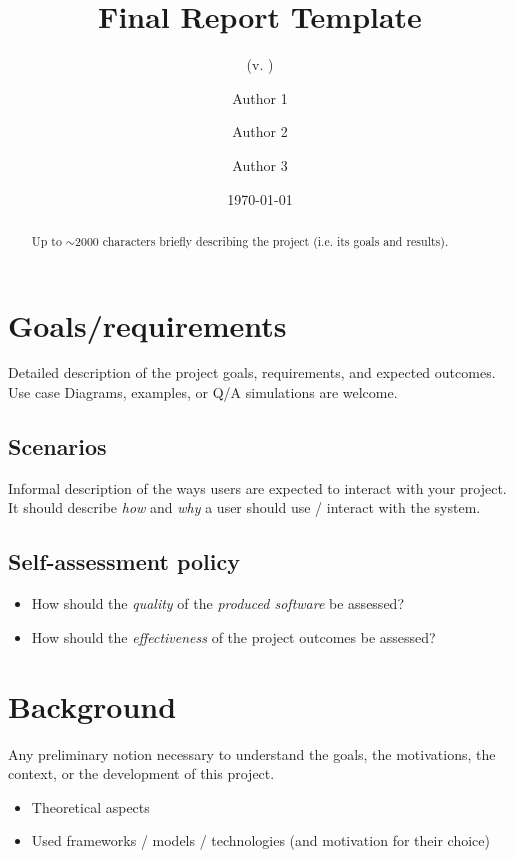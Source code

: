 \documentclass{scrartcl}
\title{\LARGE
    Final Report Template
}
\subtitle{(v. \version)}
\author{
    Author 1 \\ \emailaddr{author1@email.it}
    \and 
    Author 2 \\ \emailaddr{author2@gmail.com} 
    \and 
    Author 3 \\ \emailaddr{author3@unibo.it}
}
\date{\today}
\begin{document}
\maketitle

\begin{abstract}
    Up to $\sim$2000 characters briefly describing the project (i.e. its goals and results).
\end{abstract}

\section{Goals/requirements}

Detailed description of the project goals, requirements, and expected outcomes.
%
Use case Diagrams, examples, or Q/A simulations are welcome.

\subsection{Scenarios}

Informal description of the ways users are expected to interact with your project.
%
It should describe \emph{how} and \emph{why} a user should use / interact with the system.

\subsection{Self-assessment policy}

\begin{itemize}
    \item How should the \emph{quality} of the \emph{produced software} be assessed?
    
    \item How should the \emph{effectiveness} of the project outcomes be assessed?
\end{itemize}

\section{Background}

Any preliminary notion necessary to understand the goals, the motivations, the context, or the development of this project.
%
\begin{itemize}
    \item Theoretical aspects
    
    \item Used frameworks / models / technologies (and motivation for their choice)
\end{itemize}
\end{document}
